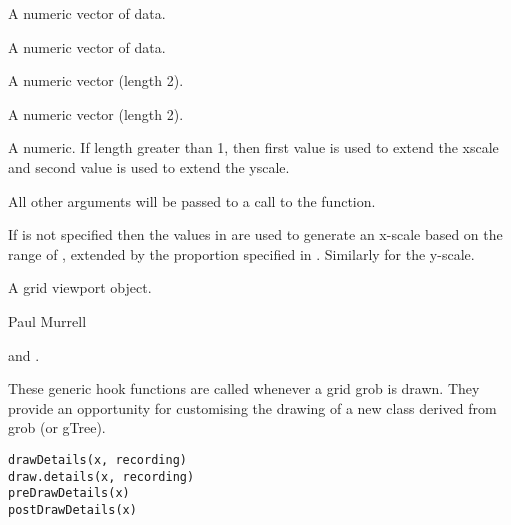 \begin{Arguments}
\begin{ldescription}
\item[\code{xData}]  A numeric vector of data. 
\item[\code{yData}]  A numeric vector of data. 
\item[\code{xscale}]  A numeric vector (length 2). 
\item[\code{yscale}]  A numeric vector (length 2). 
\item[\code{extension}]  A numeric.  If length greater than 1, then
first value is used to extend the xscale and second value
is used to extend the yscale.

\item[\code{...}]  All other arguments will be passed to a call to
the  function. 
\end{ldescription}
\end{Arguments}
%
\begin{Details}\relax
If  is not specified then the values in  are
used to generate an x-scale based on the range of , extended
by the proportion specified in .  Similarly for the
y-scale.
\end{Details}
%
\begin{Value}
A grid viewport object.
\end{Value}
%
\begin{Author}\relax
 Paul Murrell 
\end{Author}
%
\begin{SeeAlso}\relax
{} and
.
\end{SeeAlso}
%
\begin{Description}\relax
These generic hook functions are called whenever a grid grob is drawn.
They provide an opportunity for customising the drawing of a
new class derived from grob (or gTree).
\end{Description}
%
\begin{Usage}
\begin{verbatim}
drawDetails(x, recording)
draw.details(x, recording)
preDrawDetails(x)
postDrawDetails(x)
\end{verbatim}
\end{Usage}
